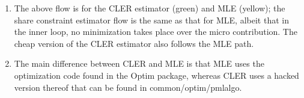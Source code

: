 \documentclass[12pt]{article}
\begin{document}
{\LARGE
\begin{enumerate}
    \item The above flow is for the CLER estimator (green) and MLE (yellow); the share constraint estimator flow is the same as that for MLE, albeit that in the inner loop, no minimization takes place over the micro contribution.  The cheap version of the CLER estimator also follows the MLE path.
    \item The main difference between CLER and MLE is that MLE uses the optimization code found in the Optim package, whereas CLER uses a hacked version thereof that can be found in common/optim/pmlalgo.
\end{enumerate}
}
\end{document}
